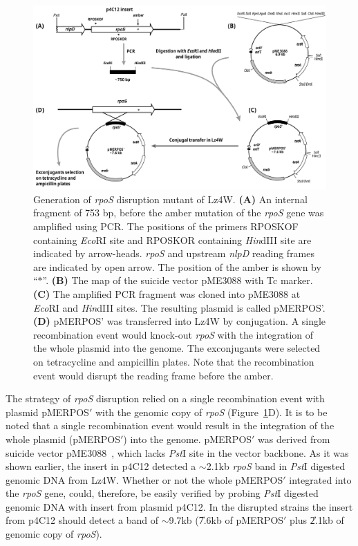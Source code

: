 \begin{figure}
\centering
\includegraphics{figures/chap6_knock_out}
\caption[Generation of \emph{rpoS} disruption mutant]{Generation
of \emph{rpoS} disruption mutant of Lz4W. \textbf{(A)} An internal
fragment of 753 bp, before the amber mutation of the \emph{rpoS}
gene was amplified using PCR. The positions of the primers RPOSKOF
containing \emph{Eco}RI site and RPOSKOR containing \emph{Hin}dIII
site are indicated by arrow-heads\@. \emph{rpoS} and upstream
\emph{nlpD} reading frames are indicated by open arrow. The
position of the amber is shown by ``$\ast$''. \textbf{(B)} The map
of the suicide vector pME3088 with Tc marker. \textbf{(C)}
The amplified PCR fragment was cloned into pME3088 at \emph{Eco}RI
and \emph{Hin}dIII sites. The resulting plasmid is called
pMERPOS'. \textbf{(D)} pMERPOS' was transferred into Lz4W by
conjugation. A single recombination event would knock-out
\emph{rpoS} with the integration of the whole plasmid into the
genome. The exconjugants were selected on tetracycline and
ampicillin plates. Note that the recombination event would disrupt
the reading frame before the amber.} \label{chap6_rpos_disruption}
\end{figure}


The strategy of \emph{rpoS} disruption relied on a single
recombination event with plasmid pMERPOS$'$ with the genomic copy
of \emph{rpoS} (Figure~\ref{chap6_rpos_disruption}D)\@. It is to
be noted that a single recombination event would result in the
integration of the whole plasmid (pMERPOS$'$) into the genome.
pMERPOS$'$ was derived from suicide vector
pME3088~\citep[Figure~\ref{chap6_rpos_disruption}B]{Schnider2000},
which lacks \emph{Pst}I site in the vector backbone. As it was
shown earlier, the insert in p4C12 detected a \U{$\sim$2.1}{kb}
\emph{rpoS} band in \emph{Pst}I digested genomic DNA from Lz4W.
Whether or not the whole pMERPOS$'$ integrated into the
\emph{rpoS} gene, could, therefore, be easily verified by probing
\emph{Pst}I digested genomic DNA with insert from plasmid p4C12.
In the disrupted strains the insert from p4C12 should detect a
band of \U{$\sim$9.7}{kb} (\U{7.6}{kb} of pMERPOS$'$ plus
\U{2.1}{kb} of genomic copy of \emph{rpoS}).


